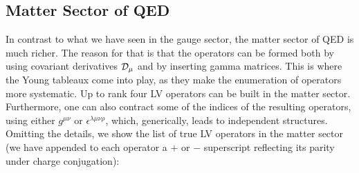 \documentclass[12pt,preprintnumbers,nofootinbib]{revtex4}
\begin{document}
\subsection{Matter Sector of QED}

	In contrast to what we have seen in the gauge sector, 
	the matter sector of QED is much
	richer.
	The reason for that is that the operators can be formed both
	by using covariant derivatives $ \cal{D}_\mu $ and by 
	inserting gamma matrices.
	This is where the Young tableaux come into play,
	as they make the enumeration of operators more systematic.
	Up to rank four LV operators can be built in the matter sector.
	Furthermore, one can also contract some of the indices of the
	resulting operators, using either $ g^{\mu\nu} $ or $ \epsilon^{\lambda\mu\nu\rho} $,
	which, generically, leads to independent structures.
	Omitting the details, we show the list of true LV operators
	in the matter sector
	(we have appended to each operator a $+$ or $-$ superscript reflecting
	its parity under charge conjugation):
\end{document}
